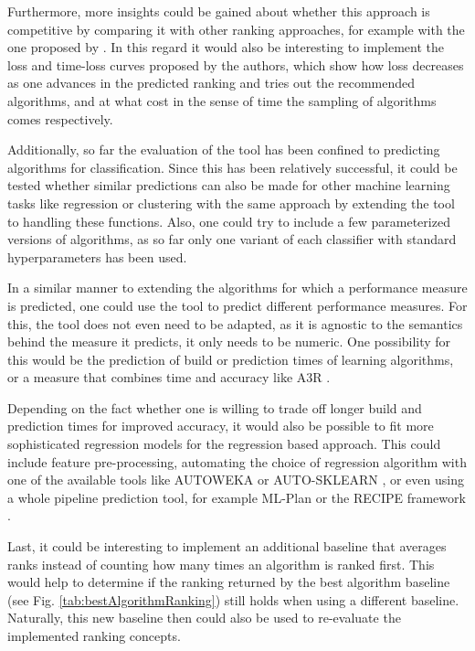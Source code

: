Furthermore, more insights could be gained about whether this approach is competitive by comparing it with other ranking approaches, for example with the one proposed by \citeauthor{DBLP:journals/ml/AbdulrahmanBRV18} \cite{DBLP:journals/ml/AbdulrahmanBRV18}. In this regard it would also be interesting to implement the loss and time-loss curves proposed by the authors, which show how loss decreases as one advances in the predicted ranking and tries out the recommended algorithms, and at what cost in the sense of time the sampling of algorithms comes respectively.

Additionally, so far the evaluation of the tool has been confined to predicting algorithms for classification. Since this has been relatively successful, it could be tested whether similar predictions can also be made for other machine learning tasks like regression or clustering with the same approach by extending the tool to handling these functions. Also, one could try to include a few parameterized versions of algorithms, as so far only one variant of each classifier with standard hyperparameters has been used. 

In a similar manner to extending the algorithms for which a performance measure is predicted, one could use the tool to predict different performance measures. For this, the tool does not even need to be adapted, as it is agnostic to the semantics behind the measure it predicts, it only needs to be numeric. One possibility for this would be the prediction of build or prediction times of learning algorithms, or a measure that combines time and accuracy like A3R \cite{DBLP:journals/ml/AbdulrahmanBRV18}.

Depending on the fact whether one is willing to trade off longer build and prediction times for improved accuracy, it would also be possible to fit more sophisticated regression models for the regression based approach. This could include feature pre-processing, automating the choice of regression algorithm with one of the available tools like AUTOWEKA \cite{thornton2013auto} or AUTO-SKLEARN \cite{feurer2015efficient}, or even using a whole pipeline prediction tool, for example ML-Plan \cite{wever2017automatic} or the RECIPE framework \cite{DBLP:conf/eurogp/SaPOP17}. 

Last, it could be interesting to implement an additional baseline that averages ranks instead of counting how many times an algorithm is ranked first. This would help to determine if the ranking returned by the best algorithm baseline (see Fig. \ref{tab:bestAlgorithmRanking}) still holds when using a different baseline. Naturally, this new baseline then could also be used to re-evaluate the implemented ranking concepts. 


